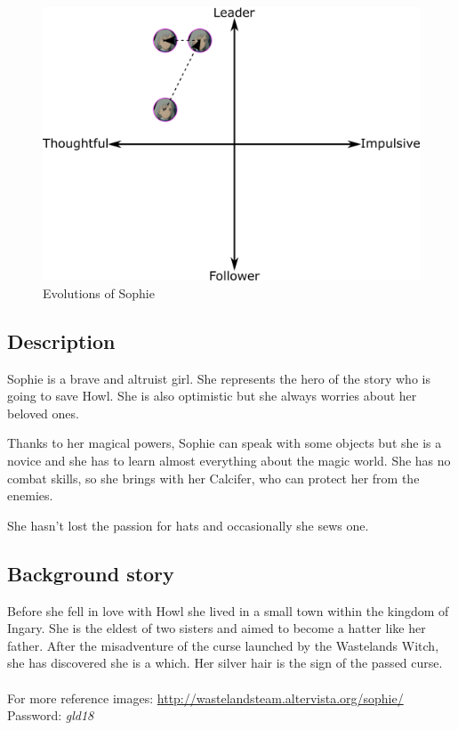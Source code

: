 \begin{figure}[H]
  \centering
  \includegraphics[width=14cm]{Images/Diagrams/Evolutions/sophieEvolution}
  \caption{Evolutions of Sophie}
\end{figure}

\subsection{Description}
Sophie is a brave and altruist girl. She represents the hero of the story who is going to save Howl. She is also optimistic but she always worries about her beloved ones.

Thanks to her magical powers, Sophie can speak with some objects but she is a novice and she has to learn almost everything about the magic world. She has no combat skills, so she brings with her Calcifer, who can protect her from the enemies.

She hasn't lost the passion for hats and occasionally she sews one.

\subsection{Background story}
Before she fell in love with Howl she lived in a small town within the kingdom of Ingary. She is the eldest of two sisters and aimed to become a hatter like her father. After the misadventure of the curse launched by the Wastelands Witch, she has discovered she is a which. Her silver hair is the sign of the passed curse.\\\\
For more reference images: \url{http://wastelandsteam.altervista.org/sophie/}\\
Password: \textit{gld18}

